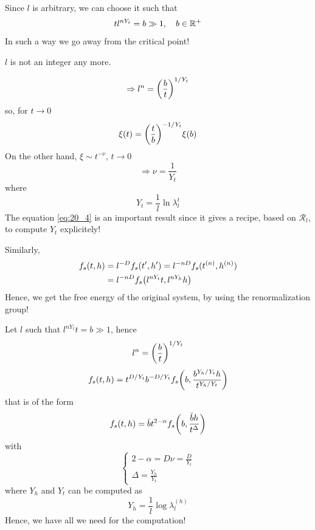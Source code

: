 \documentclass[../main/main.tex]{subfiles}
\begin{document}
Since \( l \) is arbitrary, we can choose it such that
\begin{equation}
  t l ^{n Y_t} = b \gg 1, \quad b \in \mathbb{R}^+
\end{equation}
In such a way we go away from the critical point!
\begin{remark}
\( l \) is not an integer any more.
\end{remark}
\begin{equation}
  \Rightarrow l^n = \qty(\frac{b}{t})^{1/Y_t}
\end{equation}
so, for \( t \rightarrow 0 \)
\begin{equation}
  \xi (t) = \qty(\frac{t}{b})^{-1/Y_t} \xi (b)
\end{equation}
On the other hand, \( \xi \sim t^{-\nu } \), \( t \rightarrow 0 \)
\begin{equation}
  \Rightarrow \nu = \frac{1}{Y_t}
\end{equation}
where
\begin{equation}
  Y_t  = \frac{1}{l} \ln{\lambda _l^t}
  \label{eq:20_4}
\end{equation}
The equation \eqref{eq:20_4} is an important result since it gives a recipe, based on \( \mathcal{R}_l \), to compute \( Y_t \) explicitely!

Similarly,
\begin{equation}
\begin{split}
f_s (t,h)  &= l^{-D} f_s (t',h') = l^{-nD} f_s (t^{(n)},h^{(n)}) \\
& = l^{-nD} f_s \qty(l^{n Y_t}t, l^{n Y_h}h)
\end{split}
\end{equation}
Hence, we get the free energy of the original system, by using the renormalization group!

Let \( l \) such that \( l^{n Y_t} t= b \gg 1\), hence
\begin{equation}
  l^n = \qty(\frac{b}{t})^{1/Y_t}
\end{equation}
\begin{equation}
  f_s (t,h) = t^{D/Y_t} b^{-D/Y_t} f_s \qty(b, \frac{b^{Y_h/Y_t}h}{t^{Y_h/Y_t}})
\end{equation}
that is of the form
\begin{equation}
  f_s (t,h) = \bar{b} t^{2- \alpha } f_s \qty(b, \frac{\bar{b} h}{t^{\Delta }})
\end{equation}
with
\begin{equation}
  \begin{cases}
   2 - \alpha = D \nu = \frac{D}{Y_t}\\
   \Delta = \frac{Y_h}{Y_t}
  \end{cases}
\end{equation}
where \( Y_h \) and \( Y_t \) can be computed as
\begin{equation}
  Y_h = \frac{1}{l} \log{\lambda _l^{(h)}}
\end{equation}
Hence, we have all we need for the computation!
\end{document}
